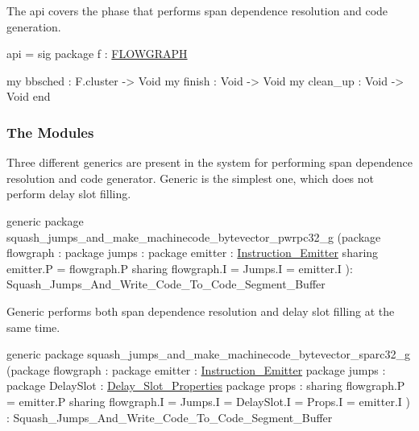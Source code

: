 The  api covers the phase that performs
span dependence resolution and code generation.
\begin{SML}
api  = sig
  package f : \href{cluster.html}{FLOWGRAPH}

  my bbsched : F.cluster -> Void
  my finish : Void -> Void
  my clean_up : Void -> Void
end
\end{SML}

\subsubsection{The Modules}

Three different generics are present in the \MLRISC{} system for
performing span dependence resolution and code generator.
Generic  is the simplest one, which does not perform
delay slot filling.
\begin{SML}
generic package squash_jumps_and_make_machinecode_bytevector_pwrpc32_g
  (package flowgraph : 
   package jumps : 
   package emitter : \href{mc.html}{Instruction_Emitter}
     sharing emitter.P = flowgraph.P
     sharing flowgraph.I = Jumps.I = emitter.I
  ): Squash_Jumps_And_Write_Code_To_Code_Segment_Buffer 
\end{SML}

Generic  performs both span dependence
resolution and delay slot filling at the same time.
\begin{SML}
generic package squash_jumps_and_make_machinecode_bytevector_sparc32_g
  (package flowgraph : 
   package emitter : \href{mc.html}{Instruction_Emitter}
   package jumps : 
   package DelaySlot : \href{delayslots.html}{Delay_Slot_Properties}
   package props : 
     sharing flowgraph.P = emitter.P
     sharing flowgraph.I = Jumps.I = DelaySlot.I = Props.I = emitter.I
  ) : Squash_Jumps_And_Write_Code_To_Code_Segment_Buffer 
\end{SML}

